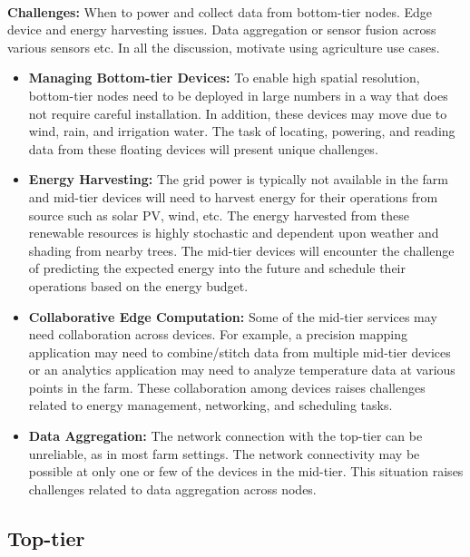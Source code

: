 \\\textbf{Challenges:} When to power and collect data from bottom-tier nodes. Edge device and energy harvesting issues. Data aggregation or sensor fusion across various sensors etc. In all the discussion, motivate using agriculture use cases.
\begin{itemize}
    \item \textbf{Managing Bottom-tier Devices:} To enable high spatial resolution, bottom-tier nodes need to be deployed in large numbers in a way that does not require careful installation. In addition, these devices may move due to wind, rain, and irrigation water. The task of locating, powering, and reading data from these floating devices will present unique challenges. 
    \item \textbf{Energy Harvesting:} The grid power is typically not available in the farm and mid-tier devices will need to harvest energy for their operations from source such as solar PV, wind, etc. The energy harvested from these renewable resources is highly stochastic and dependent upon weather and shading from nearby trees. The mid-tier devices will encounter the challenge of predicting the expected energy into the future and schedule their operations based on the energy budget.  
    \item \textbf{Collaborative Edge Computation:} Some of the mid-tier services may need collaboration across devices. For example, a precision mapping application may need to combine/stitch data from multiple mid-tier devices or an analytics application may need to analyze temperature data at various points in the farm. These collaboration among devices raises challenges related to energy management, networking, and scheduling tasks. 
    \item \textbf{Data Aggregation:} The network connection with the top-tier can be unreliable, as in most farm settings. The network connectivity may be possible at only one or few of the devices in the mid-tier. This situation raises challenges related to data aggregation across nodes. 
\end{itemize}





\subsection{Top-tier}


